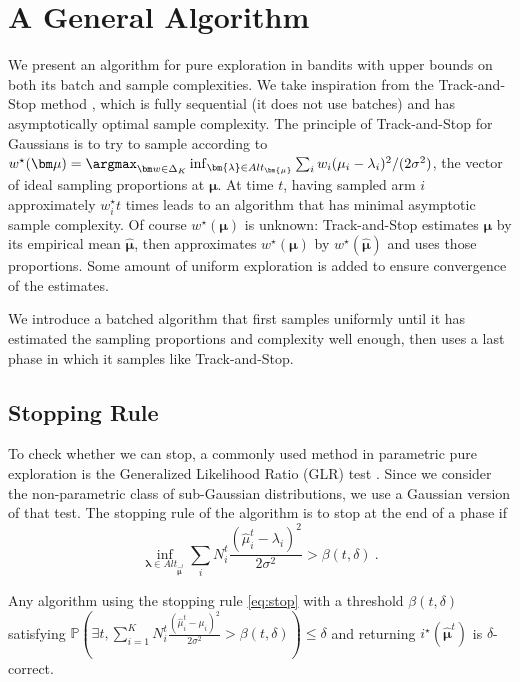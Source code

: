 

\section{A General Algorithm}\label{sect:alg}

We present an algorithm for pure exploration in bandits with upper bounds on both its batch and sample complexities.
We take inspiration from the Track-and-Stop method \citep{garivierOptimalBestArm2016}, which is fully sequential (it does not use batches) and has asymptotically optimal sample complexity.
The principle of Track-and-Stop for Gaussians is to try to sample according to $w^\star(\bm\mu)=\argmax_{\bm w\in \Delta_K} \inf_{\bm{\lambda} \in Alt_{\bm{\mu}}} \sum_i w_i (\mu_i -\lambda_i)^2/(2\sigma^2)$, the vector of ideal sampling proportions at $\bm\mu$. At time $t$, having sampled arm $i$ approximately $w^\star_i t$ times leads to an algorithm that has minimal asymptotic sample complexity.
Of course $w^\star(\bm\mu)$ is unknown: Track-and-Stop estimates $\bm\mu$ by its empirical mean $\bm{\hat{\mu}}$, then approximates $w^\star(\bm\mu)$ by $w^\star(\bm{\hat{\mu}})$ and uses those proportions.
Some amount of uniform exploration is added to ensure convergence of the estimates.



We introduce a batched algorithm that first samples uniformly until it has estimated the sampling proportions and complexity well enough, then uses a last phase in which it samples like Track-and-Stop.

\subsection{Stopping Rule}

To check whether we can stop, a commonly used method in parametric pure exploration is the Generalized Likelihood Ratio (GLR) test \citep{garivierOptimalBestArm2016}.
Since we consider the non-parametric class of sub-Gaussian distributions, we use a Gaussian version of that test.
The stopping rule of the algorithm is to stop at the end of a phase if
\begin{equation}\label{eq:stop}
	\inf_{\bm\lambda \in Alt_{\hat{\bm\mu}^t} } \sum_i N_i^t\frac{(\hat{\mu}_i^t-\lambda_i)^2}{2\sigma^2} >\beta(t,\delta)
	\: .
\end{equation}

\begin{lemma}\label{lem:beta}
	Any algorithm using the stopping rule \eqref{eq:stop} with a threshold $\beta(t, \delta)$ satisfying
	$\mathbb{P}\left(\exists t,\sum_{i=1}^K N_i^t \frac{(\hat{\mu}_i^t-\mu_i)^2}{2\sigma^2} >\beta(t,\delta)\right) \le \delta$ and returning $i^\star(\hat{\bm\mu}^t)$ is $\delta$-correct.	
\end{lemma} 

